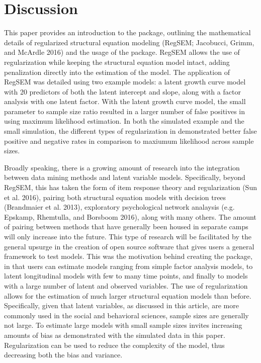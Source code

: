 \documentclass[article]{jss}
\begin{document}
\section{Discussion}\label{discussion}

This paper provides an introduction to the  package,
outlining the mathematical details of regularized structural equation
modeling (RegSEM; Jacobucci, Grimm, and McArdle 2016) and the usage of
the  package. RegSEM allows the use of regularization while
keeping the structural equation model intact, adding penalization
directly into the estimation of the model. The application of RegSEM was
detailed using two example models: a latent growth curve model with 20
predictors of both the latent intercept and slope, along with a factor
analysis with one latent factor. With the latent growth curve model, the
small parameter to sample size ratio resulted in a larger number of
false positives in using maximum likelihood estimation. In both the
simulated example and the small simulation, the different types of
regularization in  demonstrated better false positive and
negative rates in comparison to maxiumum likelihood across sample sizes.

Broadly speaking, there is a growing amount of research into the
integration between data mining methods and latent variable models.
Specifically, beyond RegSEM, this has taken the form of item response
theory and regularization (Sun et al. 2016), pairing both structural
equation models with decision trees (Brandmaier et al. 2013),
exploratory psychological network analaysis (e.g. Epskamp, Rhemtulla,
and Borsboom 2016), along with many others. The amount of pairing
between methods that have generally been housed in separate camps will
only increase into the future. This type of research will be facilitated
by the general upsurge in the creation of open source software that
gives users a general framework to test models. This was the motivation
behind creating the  package, in that users can estimate
models ranging from simple factor analysis models, to latent
longitudinal models with few to many time points, and finally to models
with a large number of latent and observed variables. The use of
regularization allows for the estimation of much larger structural
equation models than before. Specifically, given that latent variables,
as discussed in this article, are more commonly used in the social and
behavioral sciences, sample sizes are generally not large. To estimate
large models with small sample sizes invites increasing amounts of bias
as demonstrated with the simulated data in this paper. Regularization
can be used to reduce the complexity of the model, thus decreasing both
the bias and variance.
\end{document}
